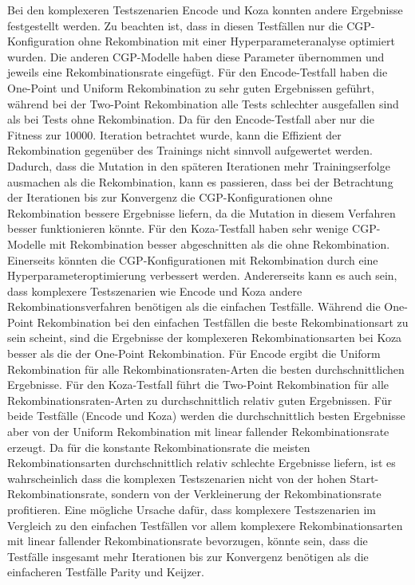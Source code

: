 Bei den komplexeren Testszenarien Encode und Koza konnten andere Ergebnisse festgestellt werden.
Zu beachten ist, dass in diesen Testfällen nur die CGP-Konfiguration ohne Rekombination mit einer Hyperparameteranalyse optimiert wurden.
Die anderen CGP-Modelle haben diese Parameter übernommen und jeweils eine Rekombinationsrate eingefügt.
Für den Encode-Testfall haben die One-Point und Uniform Rekombination zu sehr guten Ergebnissen geführt, während bei der Two-Point Rekombination alle Tests schlechter ausgefallen sind als bei Tests ohne Rekombination.
Da für den Encode-Testfall aber nur die Fitness zur 10000. Iteration betrachtet wurde, kann die Effizient der Rekombination gegenüber des Trainings nicht sinnvoll aufgewertet werden.
Dadurch, dass die Mutation in den späteren Iterationen mehr Trainingserfolge ausmachen als die Rekombination, kann es passieren, dass bei der Betrachtung der Iterationen bis zur Konvergenz die CGP-Konfigurationen ohne Rekombination bessere Ergebnisse liefern, da die Mutation in diesem Verfahren besser funktionieren könnte.
Für den Koza-Testfall haben sehr wenige CGP-Modelle mit Rekombination besser abgeschnitten als die ohne Rekombination.
Einerseits könnten die CGP-Konfigurationen mit Rekombination durch eine Hyperparameteroptimierung verbessert werden.
Andererseits kann es auch sein, dass komplexere Testszenarien wie Encode und Koza andere Rekombinationsverfahren benötigen als die einfachen Testfälle.
Während die One-Point Rekombination bei den einfachen Testfällen die beste Rekombinationsart zu sein scheint, sind die Ergebnisse der komplexeren Rekombinationsarten bei Koza besser als die der One-Point Rekombination.
Für Encode ergibt die Uniform Rekombination für alle Rekombinationsraten-Arten die besten durchschnittlichen Ergebnisse.
Für den Koza-Testfall führt die Two-Point Rekombination für alle Rekombinationsraten-Arten zu durchschnittlich relativ guten Ergebnissen.
Für beide Testfälle (Encode und Koza) werden die durchschnittlich besten Ergebnisse aber von der Uniform Rekombination mit linear fallender Rekombinationsrate erzeugt.
Da für die konstante Rekombinationsrate die meisten Rekombinationsarten durchschnittlich relativ schlechte Ergebnisse liefern, ist es wahrscheinlich dass die komplexen Testszenarien nicht von der hohen Start-Rekombinationsrate, sondern von der Verkleinerung der Rekombinationsrate profitieren.
Eine mögliche Ursache dafür, dass komplexere Testszenarien im Vergleich zu den einfachen Testfällen vor allem komplexere Rekombinationsarten mit linear fallender Rekombinationsrate bevorzugen, könnte sein, dass die Testfälle insgesamt mehr Iterationen bis zur Konvergenz benötigen als die einfacheren Testfälle Parity und Keijzer.
